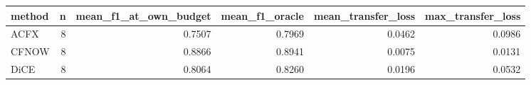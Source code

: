 \begin{tabular}{lrrrrr}
\toprule
method &  n &  mean\_f1\_at\_own\_budget &  mean\_f1\_oracle &  mean\_transfer\_loss &  max\_transfer\_loss \\
\midrule
  ACFX &  8 &                 0.7507 &          0.7969 &              0.0462 &             0.0986 \\
 CFNOW &  8 &                 0.8866 &          0.8941 &              0.0075 &             0.0131 \\
  DiCE &  8 &                 0.8064 &          0.8260 &              0.0196 &             0.0532 \\
\bottomrule
\end{tabular}
